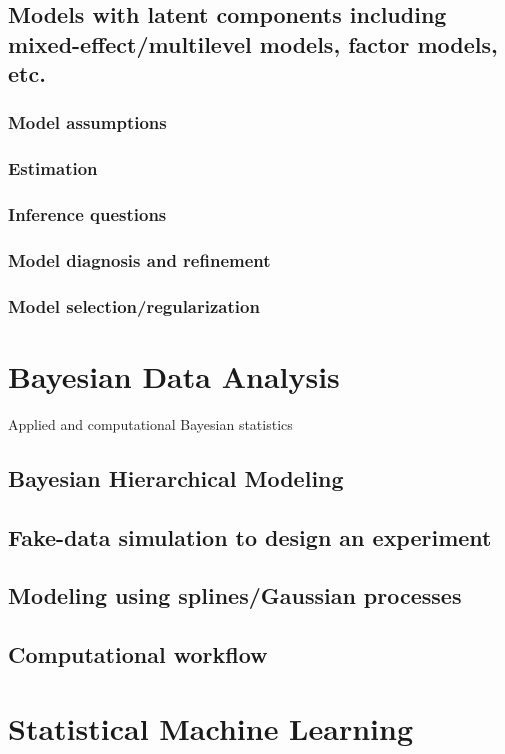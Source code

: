 \documentclass{article}
\begin{document}
\subsection{Models with latent components including mixed-effect/multilevel models, factor models, etc.}
\subsubsection{Model assumptions}
\subsubsection{Estimation}
\subsubsection{Inference questions}
\subsubsection{Model diagnosis and refinement}
\subsubsection{Model selection/regularization}

\section{Bayesian Data Analysis}
Applied and computational Bayesian statistics
\subsection{Bayesian Hierarchical Modeling}
\subsection{Fake-data simulation to design an experiment}
\subsection{Modeling using splines/Gaussian processes}
\subsection{Computational workflow}

\section{Statistical Machine Learning}
\end{document}
